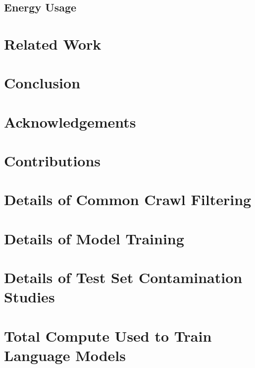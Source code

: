 \documentclass{article}
\begin{document}
    \subsection{Energy Usage}
    \label{section:Energy Usage}
    

%
%
\section{Related Work}
\label{section:Related Work}

    
    

%
%
\section{Conclusion}
\label{section:Conclusion}


\section*{Acknowledgements}

\newpage
\section*{Contributions}


\appendix
\clearpage
\newpage
\section{Details of Common Crawl Filtering}
\label{appendix:common_crawl_filtering}

\section{Details of Model Training}
\label{appendix:model_training}

\section{Details of Test Set Contamination Studies}
\label{appendix:test_set_contamination}

\clearpage
\section{Total Compute Used to Train Language Models}
\label{appendix:total_compute_calculations}

\end{document}
